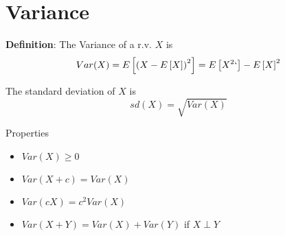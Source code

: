 \section{Variance}
\begin{framed}
   \textbf{Definition}: The Variance of a r.v. $X$ is
   \[
     Var(X) = E\left[ \left( X - E\left[ X\right] \right)^2\right]  = E\left[ X^2`\right]  - E\left[ X\right]^2
   \] 

   The standard deviation of $X$ is
   \[
     sd(X) = \sqrt{Var(X)}
   \] 

   Properties
   \begin{itemize}
      \item $Var(X) \geq 0$
      \item $Var(X + c) = Var(X)$
      \item $Var(cX)= c^2Var(X)$
      \item $Var(X + Y) =  Var(X) + Var(Y)$ if $X \perp Y$
   \end{itemize}
   
  
\end{framed}



